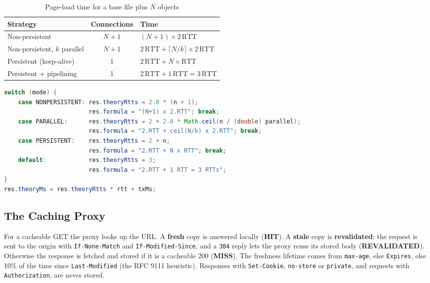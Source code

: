 \documentclass[11pt,a4paper]{article}
\begin{document}
\begin{table}[H]
\centering
\caption{Page-load time for a base file plus $N$ objects}
\small
\begin{tabularx}{\textwidth}{@{}lcY@{}}
\toprule
\textbf{Strategy} & \textbf{Connections} & \textbf{Time} \\ \midrule
Non-persistent & $N+1$ & $(N+1) \times 2\,\mathrm{RTT}$ \\
Non-persistent, $k$ parallel & $N+1$ & $2\,\mathrm{RTT} + \lceil N/k \rceil \times 2\,\mathrm{RTT}$ \\
Persistent (keep-alive) & 1 & $2\,\mathrm{RTT} + N \times \mathrm{RTT}$ \\
Persistent + pipelining & 1 & $2\,\mathrm{RTT} + 1\,\mathrm{RTT} = 3\,\mathrm{RTT}$ \\ \bottomrule
\end{tabularx}
\end{table}

\begin{lstlisting}[language=Java, caption={The formulas used for comparison (\texttt{client/PageLoad.java}); transmission time at the link rate is added.}]
switch (mode) {
    case NONPERSISTENT: res.theoryRtts = 2.0 * (n + 1);
                        res.formula = "(N+1) x 2.RTT"; break;
    case PARALLEL:      res.theoryRtts = 2 + 2.0 * Math.ceil(n / (double) parallel);
                        res.formula = "2.RTT + ceil(N/k) x 2.RTT"; break;
    case PERSISTENT:    res.theoryRtts = 2 + n;
                        res.formula = "2.RTT + N x RTT"; break;
    default:            res.theoryRtts = 3;
                        res.formula = "2.RTT + 1 RTT = 3 RTTs";
}
res.theoryMs = res.theoryRtts * rtt + txMs;
\end{lstlisting}

\subsection{The Caching Proxy}
For a cacheable GET the proxy looks up the URL. A \textbf{fresh} copy is answered locally (\textbf{HIT}). A \textbf{stale} copy is \textbf{revalidated}: the request is sent to the origin with \texttt{If-None-Match} and \texttt{If-Modified-Since}, and a \texttt{304} reply lets the proxy reuse its stored body (\textbf{REVALIDATED}). Otherwise the response is fetched and stored if it is a cacheable 200 (\textbf{MISS}). The freshness lifetime comes from \texttt{max-age}, else \texttt{Expires}, else 10\% of the time since \texttt{Last-Modified} (the RFC 9111 heuristic). Responses with \texttt{Set-Cookie}, \texttt{no-store} or \texttt{private}, and requests with \texttt{Authorization}, are never stored.
\end{document}
